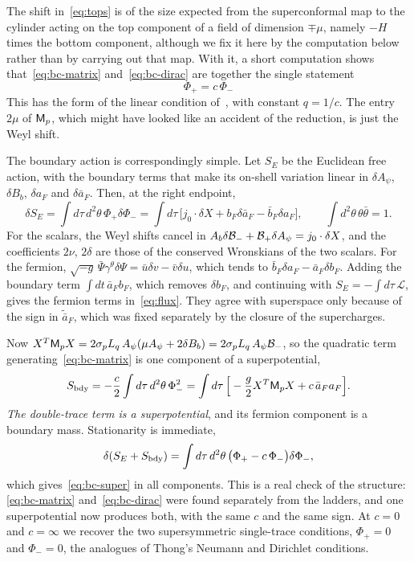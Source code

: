 The shift in~\eqref{eq:tops} is of the size expected from the superconformal map to the cylinder acting on the top component of a field of dimension $\mp\mu$, namely $-H$ times the bottom component, although we fix it here by the computation below rather than by carrying out that map. With it, a short computation shows that~\eqref{eq:bc-matrix} and~\eqref{eq:bc-dirac} are together the single statement
\begin{equation}\label{eq:bc-super}
\boxed{\ \Phi_+=c\,\Phi_-\ }
\end{equation}
This has the form of the linear condition of~\cite{Amsel:2008iz}, with constant $q=1/c$. The entry $2\mu$ of $\mathsf{M}_p$, which might have looked like an accident of the reduction, is just the Weyl shift.

The boundary action is correspondingly simple. Let $S_E$ be the Euclidean free action, with the boundary terms that make its on-shell variation linear in $\delta A_\psi$, $\delta B_b$, $\delta a_F$ and $\delta\bar a_F$. Then, at the right endpoint,
\begin{equation}\label{eq:flux}
\delta S_E=\int d\tau\,d^2\theta\,\Phi_+\delta\Phi_-=\int d\tau\,\big[j_0\cdot\delta X+b_F\delta\bar a_F-\bar b_F\delta a_F\big],\qquad\int d^2\theta\,\theta\bar\theta=1.
\end{equation}
For the scalars, the Weyl shifts cancel in $A_b\delta\mathcal{B}_-+\mathcal{B}_+\delta A_\psi=j_0\cdot\delta X$, and the coefficients $2\nu$, $2\delta$ are those of the conserved Wronskians of the two scalars. For the fermion, $\sqrt{-g}\,\bar\Psi\gamma^\theta\delta\Psi=\bar u\delta v-\bar v\delta u$, which tends to $\bar b_F\delta a_F-\bar a_F\delta b_F$. Adding the boundary term $\int dt\,\bar a_Fb_F$, which removes $\delta b_F$, and continuing with $S_E=-\int d\tau\,\mathcal L$, gives the fermion terms in~\eqref{eq:flux}. They agree with superspace only because of the sign in $\tilde{\bar a}_F$, which was fixed separately by the closure of the supercharges.

Now $X^T\mathsf{M}_pX=2\sigma_pL_q\,A_\psi(\mu A_\psi+2\delta B_b)=2\sigma_pL_q\,A_\psi\mathcal{B}_-$, so the quadratic term generating~\eqref{eq:bc-matrix} is one component of a superpotential,
\begin{equation}\label{eq:superpotential}
S_{\rm bdy}=-\frac c2\int d\tau\,d^2\theta\,\Phi_-^2=\int d\tau\,\Big[-\frac g2X^T\mathsf{M}_pX+c\,\bar a_Fa_F\Big].
\end{equation}
\emph{The double-trace term is a superpotential}, and its fermion component is a boundary mass. Stationarity is immediate,
\begin{equation}
\delta(S_E+S_{\rm bdy})=\int d\tau\,d^2\theta\,\big(\Phi_+-c\,\Phi_-\big)\delta\Phi_-,
\end{equation}
which gives~\eqref{eq:bc-super} in all components. This is a real check of the structure: \eqref{eq:bc-matrix} and~\eqref{eq:bc-dirac} were found separately from the ladders, and one superpotential now produces both, with the same $c$ and the same sign. At $c=0$ and $c=\infty$ we recover the two supersymmetric single-trace conditions, $\Phi_+=0$ and $\Phi_-=0$, the analogues of Thong's Neumann and Dirichlet conditions.
